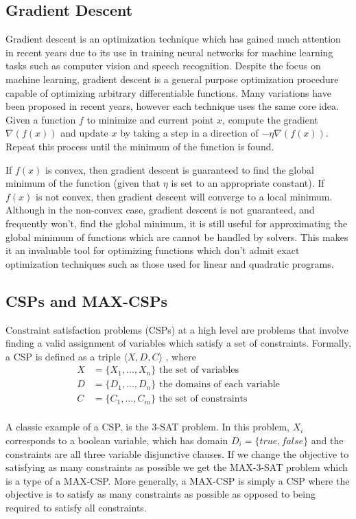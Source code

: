 \documentclass[a4paper]{article}
\begin{document}
\subsection{Gradient Descent}

Gradient descent is an optimization technique which has gained much attention
in recent years due to  its use in training neural
networks for machine learning tasks such as computer vision and speech
recognition. Despite the focus on machine learning, gradient descent is a
general purpose optimization procedure capable of optimizing arbitrary
differentiable functions. Many variations have been proposed in recent years,
however each technique uses the same core idea. Given a function $f$ to minimize and
current point $x$, compute the gradient $\nabla(f(x))$
and update $x$ by taking a step in a direction of $-\eta \nabla(f(x))$. Repeat
this process until the minimum of the function is found. 

If $f(x)$ is convex, then gradient descent is guaranteed to find the global minimum of the function
(given that $\eta$ is set to an appropriate constant). If $f(x)$ is not convex, then gradient descent will converge to a
local minimum. Although in the non-convex case, gradient descent is not
guaranteed, and frequently won't, find the global minimum, it is still useful for
approximating the global minimum of functions which are cannot be handled by solvers.
This makes it an invaluable tool for optimizing functions which don't admit
exact optimization techniques such as those used for linear and
quadratic programs.

\subsection{CSPs and MAX-CSPs}

Constraint satisfaction problems (CSPs) at a high level are problems that involve
finding a valid assignment of variables which satisfy a set of constraints.  Formally, a 
CSP is defined as a triple $\langle X, D, C \rangle$ \cite{wiki_CSP}, where 
\begin{align*}
	X &= \{X_1, ..., X_n\} \text{ the set of variables}\\
	D &= \{D_1, ..., D_n\} \text{ the domains of each variable}\\
	C &= \{C_1, ..., C_m\} \text{ the set of constraints}\\
\end{align*}

A classic example of a CSP, is the 3-SAT problem. In this problem, 
$X_i$ corresponds to a boolean variable, which has domain $D_i = \{true, false\}$
and the constraints are all three variable disjunctive clauses. If we change the objective to satisfying as 
many constraints as possible we get the MAX-3-SAT problem which is a type of a 
MAX-CSP. More generally, a MAX-CSP is simply a CSP where the objective is to 
satisfy as many constraints as possible as opposed to being required to satisfy all 
constraints.
\end{document}
